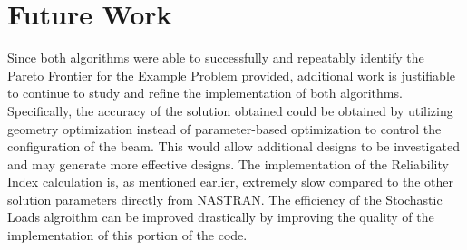 \section{Future Work}
Since both algorithms were able to successfully and repeatably identify the Pareto Frontier for the Example Problem provided, additional work is justifiable to continue to study and refine the implementation of both algorithms. Specifically, the accuracy of the solution obtained could be obtained by utilizing geometry optimization instead of parameter-based optimization to control the configuration of the beam. This would allow additional designs to be investigated and may generate more effective designs. The implementation of the Reliability Index calculation is, as mentioned earlier, extremely slow compared to the other solution parameters directly from NASTRAN. The efficiency of the Stochastic Loads algroithm can be improved drastically by improving the quality of the implementation of this portion of the code. 

